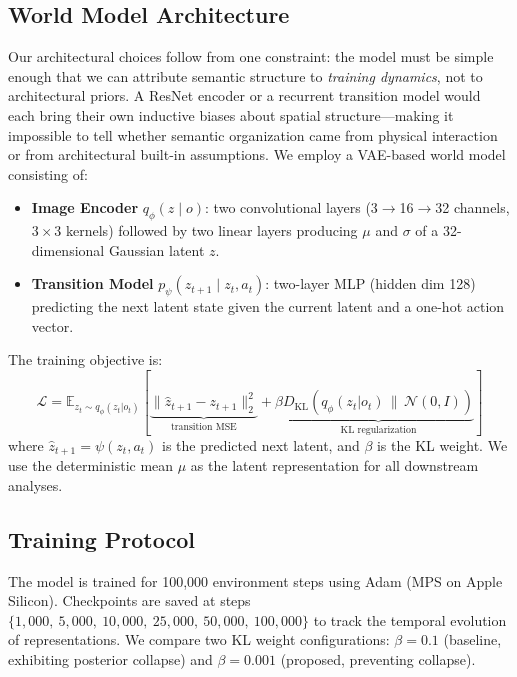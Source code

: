 \documentclass{article}
\begin{document}
\subsection{World Model Architecture}
Our architectural choices follow from one constraint:
the model must be simple enough that we can attribute semantic
structure to \emph{training dynamics}, not to architectural priors.
A ResNet encoder or a recurrent transition model would each bring
their own inductive biases about spatial structure---making it
impossible to tell whether semantic organization came from
physical interaction or from architectural built-in assumptions.
We employ a VAE-based world model consisting of:
\begin{itemize}
  \item \textbf{Image Encoder} $q_\phi(z \mid o)$:
        two convolutional layers (3$\to$16$\to$32 channels, $3\times3$ kernels)
        followed by two linear layers producing $\mu$ and $\sigma$
        of a 32-dimensional Gaussian latent $z$.
  \item \textbf{Transition Model} $p_\psi(z_{t+1} \mid z_t, a_t)$:
        two-layer MLP (hidden dim 128) predicting the next latent state
        given the current latent and a one-hot action vector.
\end{itemize}

The training objective is:
\begin{equation}
  \mathcal{L} = \mathbb{E}_{z_t \sim q_\phi(z_t|o_t)}\!\left[
    \underbrace{\|\hat{z}_{t+1} - z_{t+1}\|_2^2}_{\text{transition MSE}}
    + \beta \underbrace{D_{\mathrm{KL}}\!\left(q_\phi(z_t|o_t)\,\|\,\mathcal{N}(0,I)\right)}_{\text{KL regularization}}
  \right]
\end{equation}
where $\hat{z}_{t+1} = \psi(z_t, a_t)$ is the predicted next latent,
and $\beta$ is the KL weight.
We use the deterministic mean $\mu$ as the latent representation
for all downstream analyses.

\subsection{Training Protocol}
The model is trained for 100{,}000 environment steps
using Adam (MPS on Apple Silicon).
Checkpoints are saved at steps
$\{1{,}000,\ 5{,}000,\ 10{,}000,\ 25{,}000,\ 50{,}000,\ 100{,}000\}$
to track the temporal evolution of representations.
We compare two KL weight configurations:
$\beta = 0.1$ (baseline, exhibiting posterior collapse)
and $\beta = 0.001$ (proposed, preventing collapse).
\end{document}
